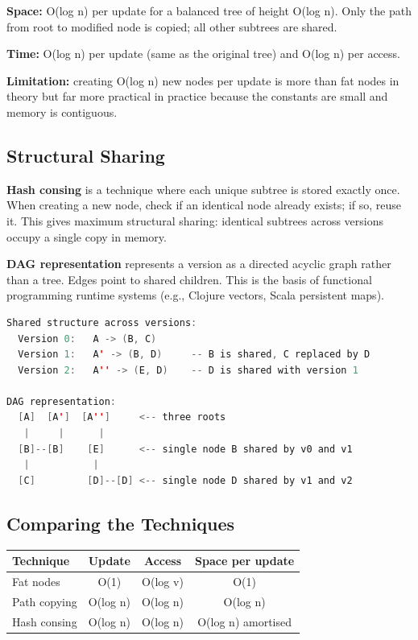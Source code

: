 \textbf{Space:} O(log n) per update for a balanced tree of height O(log n). Only the path from root to modified node is copied; all other subtrees are shared.

\textbf{Time:} O(log n) per update (same as the original tree) and O(log n) per access.

\textbf{Limitation:} creating O(log n) new nodes per update is more than fat nodes in theory but far more practical in practice because the constants are small and memory is contiguous.

\subsection{Structural Sharing}\label{sec21:structural-sharing}

\textbf{Hash consing} is a technique where each unique subtree is stored exactly once. When creating a new node, check if an identical node already exists; if so, reuse it. This gives maximum structural sharing: identical subtrees across versions occupy a single copy in memory.

\textbf{DAG representation} represents a version as a directed acyclic graph rather than a tree. Edges point to shared children. This is the basis of functional programming runtime systems (e.g., Clojure vectors, Scala persistent maps).

\begin{lstlisting}[language=Java]
Shared structure across versions:
  Version 0:   A -> (B, C)
  Version 1:   A' -> (B, D)     -- B is shared, C replaced by D
  Version 2:   A'' -> (E, D)    -- D is shared with version 1

DAG representation:
  [A]  [A']  [A'']     <-- three roots
   |     |      |
  [B]--[B]    [E]      <-- single node B shared by v0 and v1
   |           |
  [C]         [D]--[D] <-- single node D shared by v1 and v2
\end{lstlisting}

\subsection{Comparing the Techniques}

\begin{center}
\begin{tabular}{lccc}
\toprule
Technique & Update & Access & Space per update \\
\midrule
Fat nodes & O(1) & O(log v) & O(1) \\
Path copying\index{path copying} & O(log n) & O(log n) & O(log n) \\
Hash consing & O(log n) & O(log n) & O(log n) amortised \\
\bottomrule
\end{tabular}
\end{center}


